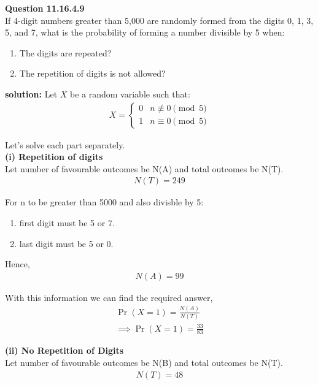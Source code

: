 \documentclass{article}
\begin{document}
\providecommand{\pr}[1]{\ensuremath{\Pr\left(#1\right)}}
\providecommand{\brak}[1]{\ensuremath{\left(#1\right)}}
\newcommand{\solution}{\noindent \textbf{solution: }}

\textbf{Question 11.16.4.9}\\
If 4-digit numbers greater than 5,000 are randomly formed from the digits 0, 1, 3, 5, and 7, what is the probability of forming a number divisible by 5 when:
\begin{enumerate}
    \item The digits are repeated?
    \item The repetition of digits is not allowed?
\end{enumerate}

\solution
Let $X$ be a random variable such that:
\begin{align}
	X = \begin{cases}
		0 & n \not\equiv 0 \pmod{5}\\
		1 & n \equiv 0 \pmod{5}\end{cases}
\end{align}

Let's solve each part separately. \\

\textbf{(i) Repetition of digits}\\
Let number of favourable outcomes be N(A) and total outcomes be N(T).
\begin{align}
	N(T)=249
\end{align}

For n to be greater than 5000 and also divisble by 5:
\begin{enumerate}
\item first digit must be 5 or 7.
\item last digit must be 5 or 0.
\end{enumerate}
Hence,
\begin{align}
	N(A)=99
\end{align}

With this information we can find the required answer,
\begin{align}
	\pr{X=1}=\frac{N(A)}{N(T)}\\
	\implies \pr{X=1}=\frac{33}{83}
\end{align}


\textbf{(ii) No Repetition of Digits}\\
Let number of favourable outcomes be N(B) and total outcomes be N(T).
\begin{align}
	N(T)=48
\end{align}
\end{document}
